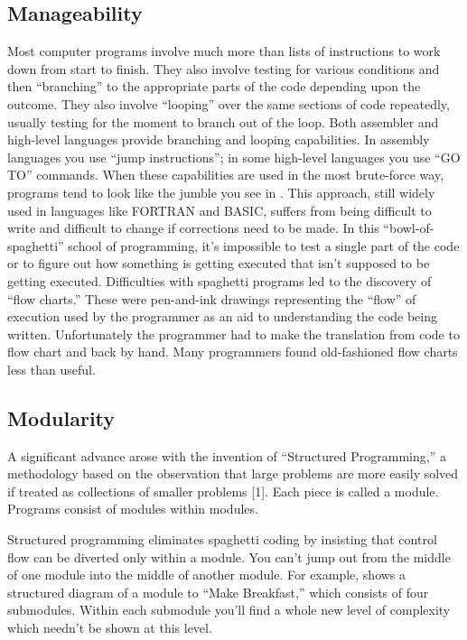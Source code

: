 \subsection{Manageability}
Most computer programs involve much more than lists of instructions
to work down from start to finish. They also involve testing for various
conditions and then {}``branching'' to the appropriate parts of the
code depending upon the outcome. They also involve {}``looping''
over the same sections of code repeatedly, usually testing for the
moment to branch out of the loop. Both assembler and high-level languages
provide branching and looping capabilities. In assembly languages
you use {}``jump instructions''; in some high-level languages you
use {}``GO TO'' commands. When these capabilities are used in the
most brute-force way, programs tend to look like the jumble you see
in . This approach, still widely used in languages like
FORTRAN and BASIC, suffers from being difficult to write and difficult
to change if corrections need to be made. In this {}``bowl-of-spaghetti''
school of programming, it's impossible to test a single part of the
code or to figure out how something is getting executed that isn't
supposed to be getting executed. Difficulties with spaghetti programs
led to the discovery of {}``flow charts.'' These were pen-and-ink
drawings representing the {}``flow'' of execution used by the programmer
as an aid to understanding the code being written. Unfortunately the
programmer had to make the translation from code to flow chart and
back by hand. Many programmers found old-fashioned flow charts less
than useful.


\subsection{Modularity}
A significant advance arose with the invention of {}``Structured
Programming,'' a methodology based on the observation that large problems
are more easily solved if treated as collections of smaller problems
{[}1{]}. Each piece is called a module. Programs consist of modules
within modules.




Structured programming eliminates spaghetti coding by insisting that
control flow can be diverted only within a module. You can't jump
out from the middle of one module into the middle of another module.
For example,  shows a structured diagram of a module to
{}``Make Breakfast,'' which consists of four submodules. Within each
submodule you'll find a whole new level of complexity which needn't
be shown at this level.

